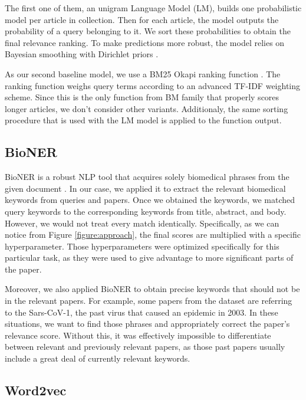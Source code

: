 \documentclass[10pt, a4paper]{article}
\begin{document}
	The first one of them, an unigram Language Model (LM), builds one probabilistic model per article in collection. Then for each article, the model outputs the probability of a query belonging to it. We sort these probabilities to obtain the final relevance ranking. To make predictions more robust, the model relies on Bayesian smoothing with Dirichlet priors \citep{zhai2004study}.
	
	As our second baseline model, we use a BM25 Okapi ranking function \citep{robertson1995okapi}. The ranking function weighs query terms according to an advanced TF-IDF weighting scheme. Since this is the only function from BM family that properly scores longer articles, we don't consider other variants. Additionaly, the same sorting procedure that is used with the LM model is applied to the function output.
	
	\subsection{BioNER}
	
	BioNER is a robust NLP tool that acquires solely biomedical phrases from the given document \citep{wang2019cross}.  In our case, we applied it to extract the relevant biomedical keywords from queries and papers.  Once we obtained the keywords, we matched query keywords to the corresponding keywords from title, abstract, and body. However, we would not treat every match identically. Specifically, as we can notice from Figure \ref{figure:approach}, the final scores are multiplied with a specific hyperparameter.  Those hyperparameters were optimized specifically for this particular task, as they were used to give advantage to more significant parts of the paper.
	
	Moreover, we also applied BioNER to obtain precise keywords that should not be in the relevant papers. For example, some papers from the dataset are referring to the Sars-CoV-1, the past virus that caused an epidemic in 2003. In these situations, we want to find those phrases and appropriately correct the paper's relevance score. Without this, it was effectively impossible to differentiate between relevant and previously relevant papers, as those past papers usually include a great deal of currently relevant keywords.
	
	\subsection{Word2vec}
	
\end{document}
